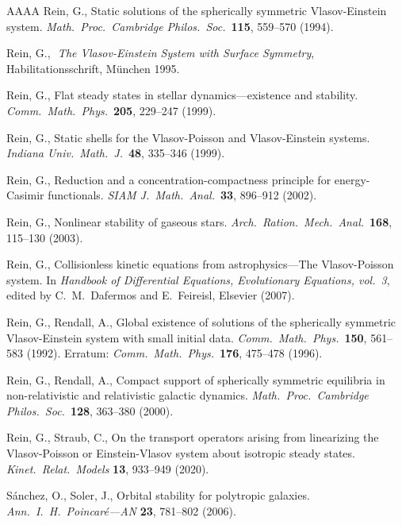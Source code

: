 \documentclass[11pt]{article}
\begin{document}
\begin{thebibliography}{AAAA}
  {\sc Rein, G.},
  Static solutions of the spherically symmetric Vlasov-Einstein
  system.
  {\em Math.\ Proc.\ Cambridge Philos.\ Soc.}\ 
  {\bf 115}, 559--570 (1994).

  {\sc Rein, G.},
  {\em\,\,The Vlasov-Einstein System with Surface Symmetry},
  Habilitations\-schrift, M\"unchen 1995.

  {\sc Rein, G.},
  Flat steady states in stellar dynamics---existence and stability.
  {\em Comm.\ Math.\ Phys.}\ 
  {\bf 205}, 229--247 (1999).

  {\sc Rein, G.},
  Static shells for the Vlasov-Poisson and Vlasov-Einstein systems.
  {\em Indiana Univ.\ Math.\ J.}\ 
  {\bf 48}, 335--346 (1999).

\bibitem{Rein02} %
  {\sc Rein, G.},
  Reduction and a concentration-compactness principle
  for energy-Casimir functionals.
  {\em SIAM J.\ Math.\ Anal.}\
  {\bf 33}, 896--912 (2002).

\bibitem{Rein03} %
  {\sc Rein, G.},
  Nonlinear stability of gaseous stars.
  {\em Arch.\ Ration.\ Mech.\ Anal.}\ 
  {\bf 168}, 115--130 (2003).

\bibitem{Rein07} %
  {\sc Rein, G.},
  Collisionless kinetic equations from astrophysics---The Vlasov-Poisson
  system.
  In {\em Handbook of Differential Equations, Evolutionary Equations,
    vol.~3}, edited by C.~M.~Dafermos and E.~Feireisl,
  Elsevier (2007).

  {\sc Rein, G., Rendall, A.},
  Global existence of solutions of the spherically symmetric
  Vlasov-Einstein system with small initial data.
  {\em Comm.\ Math.\ Phys.}\ 
  {\bf 150}, 561--583 (1992).
  Erratum: {\em Comm.\ Math.\ Phys.}\ 
  {\bf 176}, 475--478 (1996).

\bibitem{RR00} %
  {\sc Rein, G., Rendall, A.},
  Compact support of spherically symmetric equilibria in
  non-relativistic and relativistic galactic dynamics.
  {\em Math.\ Proc.\ Cambridge Philos.\ Soc.}\ 
  {\bf 128}, 363--380 (2000).

  {\sc Rein, G., Straub, C.},
  On the transport operators arising from linearizing the Vlasov-Poisson or
  Einstein-Vlasov system about isotropic steady states.
  {\em  Kinet.\ Relat.\ Models} 
  {\bf 13}, 933--949 (2020).

  {\sc S\'{a}nchez, O., Soler, J.},
  Orbital stability for polytropic galaxies.
  {\em Ann.\ I.\ H.\ Poincar\'e---AN}
  {\bf 23}, 781--802 (2006).


\end{thebibliography}
\end{document}
